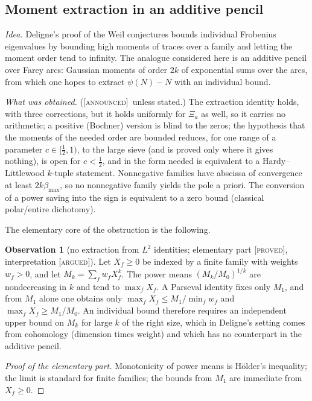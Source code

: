 \documentclass[11pt]{amsart}
\theoremstyle{definition}
\newtheorem{observation}[theorem]{Observation}
\theoremstyle{remark}
\numberwithin{equation}{section}
\newcommand{\stag}[1]{\textsc{[#1]}}
\newcommand{\PROVED}{\stag{proved}}
\newcommand{\ARGUED}{\stag{argued}}
\newcommand{\ANNOUNCED}{\stag{announced}}
\newcommand{\entry}[1]{\par\smallskip\noindent\textit{#1.}\enspace}
\begin{document}
\subsection{Moment extraction in an additive pencil}\label{w7:fam:R22}

\entry{Idea} Deligne's proof of the Weil conjectures \cite{Deligne1974} bounds individual Frobenius eigenvalues by bounding high
moments of traces over a family and letting the moment order tend to infinity. The analogue considered here
is an additive pencil over Farey arcs: Gaussian moments of order $2k$ of exponential sums over the arcs, from
which one hopes to extract $\psi(N)-N$ with an individual bound.

\entry{What was obtained} (\ANNOUNCED\ unless stated.) The extraction identity holds, with three corrections,
but it holds uniformly for $\Xi_a$ as well, so it carries no arithmetic; a positive (Bochner) version is blind to
the zeros; the hypothesis that the moments of the needed order are bounded reduces, for one range of a parameter
$c\in[\frac12,1)$, to the large sieve (and is proved only where it gives nothing), is open for $c<\frac12$, and in
the form needed is equivalent to a Hardy--Littlewood $k$-tuple statement. Nonnegative families have abscissa of
convergence at least $2k\beta_{\max}$, so no nonnegative family yields the pole a priori. The conversion of a
power saving into the sign is equivalent to a zero bound (classical polar/entire dichotomy).

The elementary core of the obstruction is the following.

\begin{observation}[no extraction from $L^2$ identities; elementary part \PROVED, interpretation \ARGUED]\label{w7:obs:L2}
Let $X_f\ge0$ be indexed by a finite family with weights $w_f>0$, and let $M_k=\sum_fw_fX_f^k$. The power means
$(M_k/M_0)^{1/k}$ are nondecreasing in $k$ and tend to $\max_fX_f$. A Parseval identity fixes only $M_1$, and
from $M_1$ alone one obtains only $\max_fX_f\le M_1/\min_fw_f$ and $\max_fX_f\ge M_1/M_0$. An individual bound
therefore requires an independent upper bound on $M_k$ for large $k$ of the right size, which in Deligne's
setting comes from cohomology (dimension times weight) and which has no counterpart in the additive pencil.
\end{observation}

\begin{proof}[Proof of the elementary part]
Monotonicity of power means is H\"older's inequality; the limit is standard for finite families; the bounds
from $M_1$ are immediate from $X_f\ge0$.
\end{proof}
\end{document}
